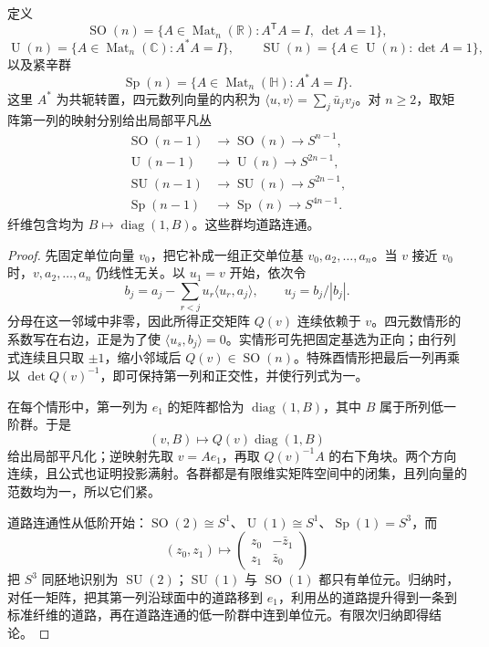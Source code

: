 \begin{proposition}\label{g2:prop:classical-sphere-bundles}
	定义
	\[
		\operatorname{SO}(n)=\{A\in\operatorname{Mat}_n(\mathbb R):A^{\mathsf T}A=I,\ \det A=1\},
	\]
	\[
		\operatorname{U}(n)=\{A\in\operatorname{Mat}_n(\mathbb C):A^*A=I\},\qquad
		\operatorname{SU}(n)=\{A\in\operatorname{U}(n):\det A=1\},
	\]
	以及紧辛群
	\[
		\operatorname{Sp}(n)=\{A\in\operatorname{Mat}_n(\mathbb H):A^*A=I\}.
	\]
	这里 \(A^*\) 为共轭转置，四元数列向量的内积为 \(\langle u,v\rangle=\sum_j\bar u_jv_j\)。对 \(n\ge2\)，取矩阵第一列的映射分别给出局部平凡丛
	\begin{equation}\label{g2:eq:classical-sphere-bundles}
		\begin{aligned}
			\operatorname{SO}(n-1)&\longrightarrow\operatorname{SO}(n)\longrightarrow S^{n-1},\\
			\operatorname{U}(n-1)&\longrightarrow\operatorname{U}(n)\longrightarrow S^{2n-1},\\
			\operatorname{SU}(n-1)&\longrightarrow\operatorname{SU}(n)\longrightarrow S^{2n-1},\\
			\operatorname{Sp}(n-1)&\longrightarrow\operatorname{Sp}(n)\longrightarrow S^{4n-1}.
		\end{aligned}
	\end{equation}
	纤维包含均为 \(B\mapsto\operatorname{diag}(1,B)\)。这些群均道路连通。
\end{proposition}
\begin{proof}
	先固定单位向量 \(v_0\)，把它补成一组正交单位基 \(v_0,a_2,\ldots,a_n\)。当 \(v\) 接近 \(v_0\) 时，\(v,a_2,\ldots,a_n\) 仍线性无关。以 \(u_1=v\) 开始，依次令
	\[
		b_j=a_j-\sum_{r<j}u_r\langle u_r,a_j\rangle,\qquad u_j=b_j/|b_j|.
	\]
	分母在这一邻域中非零，因此所得正交矩阵 \(Q(v)\) 连续依赖于 \(v\)。四元数情形的系数写在右边，正是为了使 \(\langle u_s,b_j\rangle=0\)。实情形可先把固定基选为正向；由行列式连续且只取 \(\pm1\)，缩小邻域后 \(Q(v)\in\operatorname{SO}(n)\)。特殊酉情形把最后一列再乘以 \(\det Q(v)^{-1}\)，即可保持第一列和正交性，并使行列式为一。

	在每个情形中，第一列为 \(e_1\) 的矩阵都恰为 \(\operatorname{diag}(1,B)\)，其中 \(B\) 属于所列低一阶群。于是
	\[
		(v,B)\longmapsto Q(v)\operatorname{diag}(1,B)
	\]
	给出局部平凡化；逆映射先取 \(v=Ae_1\)，再取 \(Q(v)^{-1}A\) 的右下角块。两个方向连续，且公式也证明投影满射。各群都是有限维实矩阵空间中的闭集，且列向量的范数均为一，所以它们紧。

	道路连通性从低阶开始：\(\operatorname{SO}(2)\cong S^1\)、\(\operatorname{U}(1)\cong S^1\)、\(\operatorname{Sp}(1)=S^3\)，而
	\[
		(z_0,z_1)\longmapsto\begin{pmatrix}z_0&-\bar z_1\\z_1&\bar z_0\end{pmatrix}
	\]
	把 \(S^3\) 同胚地识别为 \(\operatorname{SU}(2)\)；\(\operatorname{SU}(1)\) 与 \(\operatorname{SO}(1)\) 都只有单位元。归纳时，对任一矩阵，把其第一列沿球面中的道路移到 \(e_1\)，利用丛的道路提升得到一条到标准纤维的道路，再在道路连通的低一阶群中连到单位元。有限次归纳即得结论。
\end{proof}

